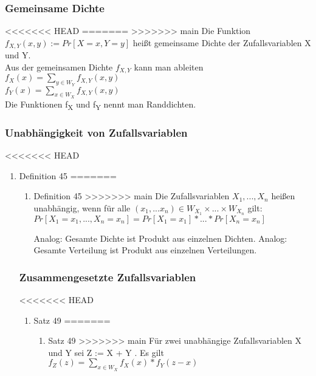 \documentclass[11pt]{article}
\begin{document}
\begin{enumerate}
\begin{enumerate}
{\subsubsection{Gemeinsame Dichte}
<<<<<<< HEAD
\label{sec:orgd94be3c}
=======
\label{sec:org74f9b90}
>>>>>>> main
Die Funktion \\
\(f_{X,Y} (x, y) := Pr[X = x, Y = y]\)
heißt gemeinsame Dichte der Zufallsvariablen X und Y. \\
Aus der gemeinsamen Dichte \(f_{X,Y}\) kann man ableiten \\
\(f_X(x) = \sum_{y \in W_Y} f_{X,Y} (x,y)\) \\
\(f_Y(x) = \sum_{x \in W_X} f_{X,Y} (x,y)\) \\
Die Funktionen f\textsubscript{X} und f\textsubscript{Y} nennt man Randdichten. \\
\subsubsection{Unabhängigkeit von Zufallsvariablen}
<<<<<<< HEAD
\label{sec:org6b5551f}
\begin{enumerate}
\item Definition 45
\label{sec:org3f3029e}
=======
\label{sec:org5a2afeb}
\begin{enumerate}
\item Definition 45
\label{sec:orgc15a45c}
>>>>>>> main
Die Zufallsvariablen \(X_1,...,X_n\) heißen unabhängig, wenn für alle \((x_1,...x_n) \in W_{X_1} \times ... \times W_{X_n}\) gilt: \\
\(Pr[X_1 = x_1,...,X_n = x_n] = Pr[X_1 = x_1] * ... * Pr[X_n = x_n]\)

Analog: Gesamte Dichte ist Produkt aus einzelnen Dichten.
Analog: Gesamte Verteilung ist Produkt aus einzelnen Verteilungen.
\end{enumerate}

\subsubsection{Zusammengesetzte Zufallsvariablen}
<<<<<<< HEAD
\label{sec:orgd65918a}
\begin{enumerate}
\item Satz 49
\label{sec:orgfe39b2b}
=======
\label{sec:org575a5d4}
\begin{enumerate}
\item Satz 49
\label{sec:org1f763aa}
>>>>>>> main
Für zwei unabhängige Zufallsvariablen X und Y sei Z := X + Y . Es gilt
\(f_Z(z) = \sum_{x \in W_X} f_X(x) * f_Y(z - x)\)
\end{enumerate}


\end{enumerate}
\end{enumerate}}
\end{enumerate}
\end{enumerate}
\end{document}
